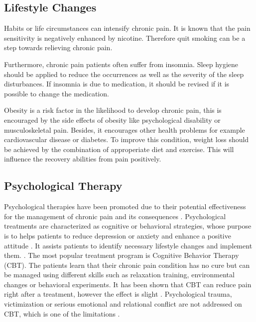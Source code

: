 \subsection{Lifestyle Changes}
Habits or life circumstances can intensify chronic pain. It is known that the pain sensitivity is negatively enhanced by nicotine. Therefore quit smoking can be a step towards relieving chronic pain.

Furthermore, chronic pain patients often suffer from insomnia. Sleep hygiene should be applied to reduce the occurrences as well as the severity of the sleep disturbances. If insomnia is due to medication, it should be revised if it is possible to change the medication.

Obesity is a risk factor in the likelihood to  develop chronic pain, this is encouraged by the side effects of obesity like psychological disability or musculoskeletal pain. Besides, it encourages other health problems for example cardiovascular disease or diabetes. To improve this condition, weight loss should be achieved by the combination of approperiate diet and exercise. This will influence the recovery abilities from pain positively. \cite{marcus2009,pope2017}

\subsection{Psychological Therapy}

Psychological therapies have been promoted due to their potential effectiveness for the management of chronic pain and its consequences \cite{Eccleston2002}. Psychological treatments are characterized as cognitive or behavioral strategies, whose purpose is to helps patients to reduce depression or anxiety and enhance a positive attitude \cite{Eccleston2013}. It assists patients to identify necessary lifestyle changes and implement them. \cite{marcus2009,pope2017}. The most popular treatment program is Cognitive Behavior Therapy (CBT). The patients learn that their chronic pain condition has no cure but can be managed using different skills such as relaxation training, environmental changes or behavioral experiments. \cite{Burger2016} It has been shown that CBT can reduce pain right after a treatment, however the effect is slight \cite{Eccleston2013}. Psychological trauma, victimization or serious emotional and relational conflict are not addressed on CBT, which is one of the limitations \cite{Burger2016}.


